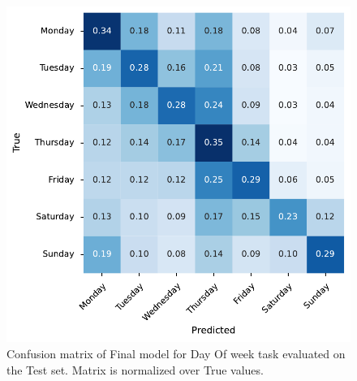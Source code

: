 \begin{figure}
    \centering
    \includegraphics[width=1.0\textwidth]{img/conf_matrix/day_of_week_test_confusion_matrix.pdf}
    \caption{Confusion matrix of Final model for Day Of week task evaluated on the Test set. Matrix is normalized over True values.}
    \label{fig:day-conf}
\end{figure}